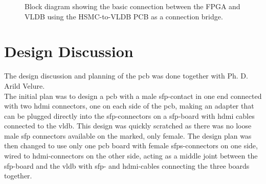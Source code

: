 \documentclass[main.tex]{subfiles}
\begin{document}
\begin{figure} %


\caption{Block diagram showing the basic connection between the FPGA and VLDB using the HSMC-to-VLDB PCB as a connection bridge.}
\label{fig:pcbdia}
\end{figure}


\section{Design Discussion}

The design discussion and planning of the \gls{pcb} was done together with Ph. D. Arild Velure.\\

The initial plan was to design a \gls{pcb} with a male \gls{sfp}-contact in one end connected with two \gls{hdmi} connectors, one on each side of the \gls{pcb}, making an adapter that can be plugged directly into the \gls{sfp}-connectors on a \gls{sfp}-board with \gls{hdmi} cables connected to the \gls{vldb}. This design was quickly scratched as there was no loose male \gls{sfp} connectors available on the marked, only female. The design plan was then changed to use only one \gls{pcb} board with female \glspl{sfp}-connectors on one side, wired to \gls{hdmi}-connectors on the other side, acting as a middle joint between the \gls{sfp}-board and the \gls{vldb} with \gls{sfp}- and \gls{hdmi}-cables connecting the three boards together. \\
\end{document}
